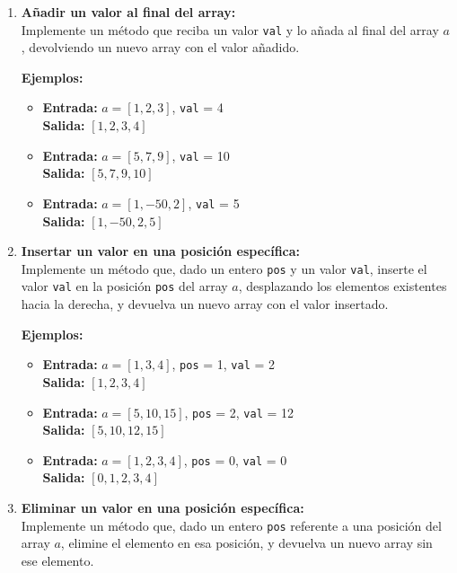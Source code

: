 \begin{enumerate}[label=\alph*)]
    \item \textbf{Añadir un valor al final del array:} \\
    Implemente un método que reciba un valor \texttt{val} y lo añada al final del array \(a\), devolviendo un nuevo array con el valor añadido.
    
    \textbf{Ejemplos:}
    \begin{itemize}
        \item \textbf{Entrada:} \(a = [1, 2, 3]\), \texttt{val} = 4 \\
        \textbf{Salida:} \([1, 2, 3, 4]\)
        \item \textbf{Entrada:} \(a = [5, 7, 9]\), \texttt{val} = 10 \\
        \textbf{Salida:} \([5, 7, 9, 10]\)
        \item \textbf{Entrada:} \(a = [1, -50, 2]\), \texttt{val} = 5 \\
        \textbf{Salida:} \([1, -50, 2, 5]\)
    \end{itemize}

    \item \textbf{Insertar un valor en una posición específica:} \\
    Implemente un método que, dado un entero \texttt{pos} y un valor \texttt{val}, inserte el valor \texttt{val} en la posición \texttt{pos} del array \(a\), desplazando los elementos existentes hacia la derecha, y devuelva un nuevo array con el valor insertado.
    
    \textbf{Ejemplos:}
    \begin{itemize}
        \item \textbf{Entrada:} \(a = [1, 3, 4]\), \texttt{pos} = 1, \texttt{val} = 2 \\
        \textbf{Salida:} \([1, 2, 3, 4]\)
        \item \textbf{Entrada:} \(a = [5, 10, 15]\), \texttt{pos} = 2, \texttt{val} = 12 \\
        \textbf{Salida:} \([5, 10, 12, 15]\)
        \item \textbf{Entrada:} \(a = [1, 2, 3, 4]\), \texttt{pos} = 0, \texttt{val} = 0 \\
        \textbf{Salida:} \([0, 1, 2, 3, 4]\)
    \end{itemize}

    \item \textbf{Eliminar un valor en una posición específica:} \\
    Implemente un método que, dado un entero \texttt{pos} referente a una posición del array \(a\), elimine el elemento en esa posición, y devuelva un nuevo array sin ese elemento.
    

\end{enumerate}
